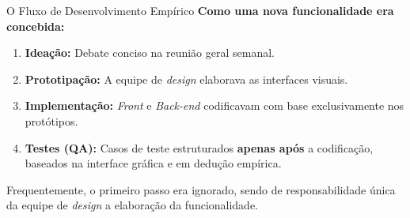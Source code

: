 \begin{frame}{O Fluxo de Desenvolvimento Empírico}
  \textbf{Como uma nova funcionalidade era concebida:}
  \begin{enumerate}
    \item \textbf{Ideação:} Debate conciso na reunião geral semanal.
    \item \textbf{Prototipação:} A equipe de \textit{design} elaborava as interfaces visuais.
    \item \textbf{Implementação:} \textit{Front} e \textit{Back-end} codificavam com base exclusivamente nos protótipos.
    \item \textbf{Testes (QA):} Casos de teste estruturados \textbf{apenas após} a codificação, baseados na interface gráfica e em dedução empírica.
  \end{enumerate}
  

  \vspace{1em}
  Frequentemente, o primeiro passo era ignorado, sendo de responsabilidade única da equipe de \textit{design} a elaboração da funcionalidade.
\end{frame}